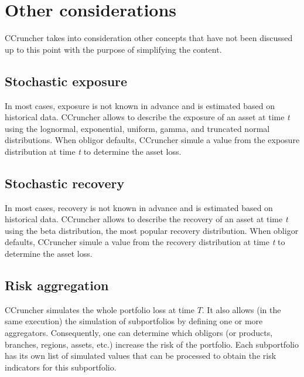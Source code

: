 \documentclass[a4paper,12pt,final]{article}
\begin{document}
\clearpage
\section{Other considerations}
CCruncher takes into consideration other concepts that have not been discussed 
up to this point with the purpose of simplifying the content.

\subsection{Stochastic exposure}
In most cases, exposure is not known in advance and is estimated based on historical data. 
CCruncher allows to describe the exposure of an asset at time \emph{t} using the lognormal,
exponential, uniform, gamma, and truncated normal distributions. When obligor defaults, 
CCruncher simule a value from the exposure distribution at time \emph{t} 
to determine the asset loss.

\subsection{Stochastic recovery}
In most cases, recovery is not known in advance and is estimated based on historical data. 
CCruncher allows to describe the recovery of an asset at time \emph{t} using the beta 
distribution, the most popular recovery distribution. When obligor defaults, 
CCruncher simule a value from the recovery distribution at time \emph{t} 
to determine the asset loss.

\subsection{Risk aggregation}
CCruncher simulates the whole portfolio loss at time $T$. It also allows (in 
the same execution) the simulation of subportfolios by defining one or more 
aggregators. Consequently, one can determine which obligors (or products, 
branches, regions, assets, etc.) increase the risk of the portfolio. 
Each subportfolio has its own list of simulated values that can be processed to 
obtain the risk indicators for this subportfolio.

\end{document}
